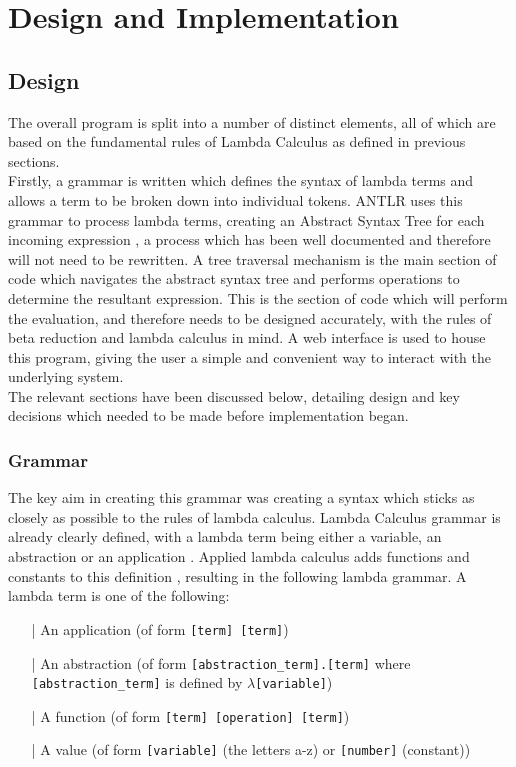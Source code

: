 \documentclass[a4paper,11pt]{report}
\begin{document}
\chapter{Design and Implementation}
\section{Design}

The overall program is split into a number of distinct elements, all of which are based on the fundamental rules of Lambda Calculus as defined in previous sections.\\

Firstly, a grammar is written which defines the syntax of lambda terms and allows a term to be broken down into individual tokens. ANTLR uses this grammar to process lambda terms, creating an Abstract Syntax Tree for each incoming expression \cite{Parr2012}, a process which has been well documented and therefore will not need to be rewritten. A tree traversal mechanism is the main section of code which navigates the abstract syntax tree and performs operations to determine the resultant expression. This is the section of code which will perform the evaluation, and therefore needs to be designed accurately, with the rules of beta reduction and lambda calculus in mind. A web interface is used to house this program, giving the user a simple and convenient way to interact with the underlying system.\\

The relevant sections have been discussed below, detailing design and key decisions which needed to be made before implementation began. %

\subsection{Grammar}

The key aim in creating this grammar was creating a syntax which sticks as closely as possible to the rules of lambda calculus. Lambda Calculus grammar is already clearly defined, with a lambda term being either a variable, an abstraction or an application \cite{Hankin2004}. Applied lambda calculus adds functions and constants to this definition \cite{Slonneger1995}, resulting in the following lambda grammar. A lambda term is one of the following:

\begin{itemize}
\item[|] An application (of form \texttt{[term] [term]})
\item[|] An abstraction (of form \texttt{[abstraction_term].[term]} where \texttt{[abstraction_term]} is defined by \texttt{$\lambda$[variable]})
\item[|] A function (of form \texttt{[term] [operation] [term]})
\item[|] A value (of form \texttt{[variable]} (the letters a-z) or \texttt{[number]} (constant))
\end{itemize}
\end{document}
